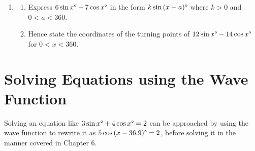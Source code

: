 \documentclass[
  11pt,
  openany]{book}
\begin{document}
\begin{enumerate}
\begin{enumerate}
    \end{enumerate}
    \item
    \begin{enumerate}
        \item Express $6\sin{x}\degree-7\cos{x}\degree$ in the form $k\sin{(x-a)}\degree$ where $k>0$ and $0<a<360$. \faCalculator
        \item Hence state the coordinates of the turning points of $12\sin{x}\degree-14\cos{x}\degree$ for $0<x<360$.
    \end{enumerate}
\end{enumerate}

\pagebreak

\section{Solving Equations using the Wave Function}\label{solving-equations-using-the-wave-function}

\vspace{-0.5cm}

Solving an equation like \(3\sin{x}\degree+4\cos{x}\degree=2\) can be approached by using the wave function to rewrite it as \(5\cos{(x-36.9)}\degree=2\), before solving it in the manner covered in Chapter 6.
\end{document}
